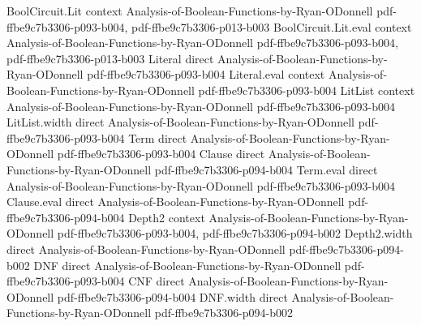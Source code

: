 \begin{theorem}
\label{LMN.depth3_compression}
\leanok
{}
\proofstep
  {BoolCircuit.Lit}
  {context}
  {Analysis-of-Boolean-Functions-by-Ryan-ODonnell}
  {pdf-ffbe9c7b3306-p093-b004,
    pdf-ffbe9c7b3306-p013-b003}
\proofstep
  {BoolCircuit.Lit.eval}
  {context}
  {Analysis-of-Boolean-Functions-by-Ryan-ODonnell}
  {pdf-ffbe9c7b3306-p093-b004,
    pdf-ffbe9c7b3306-p013-b003}
\proofstep
  {Literal}
  {direct}
  {Analysis-of-Boolean-Functions-by-Ryan-ODonnell}
  {pdf-ffbe9c7b3306-p093-b004}
\proofstep
  {Literal.eval}
  {context}
  {Analysis-of-Boolean-Functions-by-Ryan-ODonnell}
  {pdf-ffbe9c7b3306-p093-b004}
\proofstep
  {LitList}
  {context}
  {Analysis-of-Boolean-Functions-by-Ryan-ODonnell}
  {pdf-ffbe9c7b3306-p093-b004}
\proofstep
  {LitList.width}
  {direct}
  {Analysis-of-Boolean-Functions-by-Ryan-ODonnell}
  {pdf-ffbe9c7b3306-p093-b004}
\proofstep
  {Term}
  {direct}
  {Analysis-of-Boolean-Functions-by-Ryan-ODonnell}
  {pdf-ffbe9c7b3306-p093-b004}
\proofstep
  {Clause}
  {direct}
  {Analysis-of-Boolean-Functions-by-Ryan-ODonnell}
  {pdf-ffbe9c7b3306-p094-b004}
\proofstep
  {Term.eval}
  {direct}
  {Analysis-of-Boolean-Functions-by-Ryan-ODonnell}
  {pdf-ffbe9c7b3306-p093-b004}
\proofstep
  {Clause.eval}
  {direct}
  {Analysis-of-Boolean-Functions-by-Ryan-ODonnell}
  {pdf-ffbe9c7b3306-p094-b004}
\proofstep
  {Depth2}
  {context}
  {Analysis-of-Boolean-Functions-by-Ryan-ODonnell}
  {pdf-ffbe9c7b3306-p093-b004,
    pdf-ffbe9c7b3306-p094-b002}
\proofstep
  {Depth2.width}
  {direct}
  {Analysis-of-Boolean-Functions-by-Ryan-ODonnell}
  {pdf-ffbe9c7b3306-p094-b002}
\proofstep
  {DNF}
  {direct}
  {Analysis-of-Boolean-Functions-by-Ryan-ODonnell}
  {pdf-ffbe9c7b3306-p093-b004}
\proofstep
  {CNF}
  {direct}
  {Analysis-of-Boolean-Functions-by-Ryan-ODonnell}
  {pdf-ffbe9c7b3306-p094-b004}
\proofstep
  {DNF.width}
  {direct}
  {Analysis-of-Boolean-Functions-by-Ryan-ODonnell}
  {pdf-ffbe9c7b3306-p094-b002}

\end{theorem}

